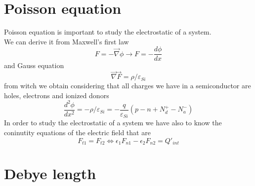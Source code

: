 \section{Poisson equation}
Poisson equation is important to study the electrostatic of a system.\\
We can derive it from Maxwell's first law 
\begin{equation}
F=-\overrightarrow{\nabla}\phi\rightarrow F=-\frac{d\phi}{dx}
\end{equation}
and Gauss equation
\begin{equation}
\overrightarrow{\nabla}\overrightarrow{F}=\rho/\varepsilon_{Si}
\end{equation}
from witch we obtain considering that all charges we have in a semiconductor are holes, electrons and ionized donors 
\begin{equation}
\frac{d^2\phi}{dx^2}=-\rho/\varepsilon_{Si}=-\frac{q}{\varepsilon_{Si}}(p-n+N_d^+-N_a^-)
\end{equation}
In order to study the electrostatic of a system we have also to know the coninutity equations of the electric field that are
\begin{equation}
F_{t1}=F_{t2} \Longleftrightarrow \epsilon_1F_{n1}-\epsilon_2F_{n2}=Q'_{int}
\end{equation}
\newline
\section{Debye length}

